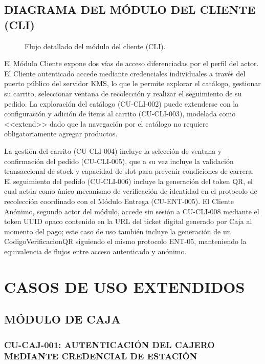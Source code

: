 \subsection{DIAGRAMA DEL MÓDULO DEL CLIENTE (CLI)}
\begin{figure}[H]
    \centering
    
    \caption{Flujo detallado del módulo del cliente (CLI).}
    \label{fig:casos_uso_cliente}
\end{figure}

El Módulo Cliente expone dos vías de acceso diferenciadas por el perfil del actor. El Cliente autenticado accede mediante credenciales individuales a través del puerto público del servidor KMS, lo que le permite explorar el catálogo, gestionar su carrito, seleccionar ventana de recolección y realizar el seguimiento de su pedido. La exploración del catálogo (CU-CLI-002) puede extenderse con la configuración y adición de ítems al carrito (CU-CLI-003), modelada como <<extend>> dado que la navegación por el catálogo no requiere obligatoriamente agregar productos.

La gestión del carrito (CU-CLI-004) incluye la selección de ventana y confirmación del pedido (CU-CLI-005), que a su vez incluye la validación transaccional de stock y capacidad de slot para prevenir condiciones de carrera. El seguimiento del pedido (CU-CLI-006) incluye la generación del token QR, el cual actúa como único mecanismo de verificación de identidad en el protocolo de recolección coordinado con el Módulo Entrega (CU-ENT-005). El Cliente Anónimo, segundo actor del módulo, accede sin sesión a CU-CLI-008 mediante el token UUID opaco contenido en la URL del ticket digital generado por Caja al momento del pago; este caso de uso también incluye la generación de un CodigoVerificacionQR siguiendo el mismo protocolo ENT-05, manteniendo la equivalencia de flujos entre acceso autenticado y anónimo.

\section{CASOS DE USO EXTENDIDOS}
\subsection{MÓDULO DE CAJA}
\subsubsection{CU-CAJ-001: AUTENTICACIÓN DEL CAJERO MEDIANTE CREDENCIAL DE ESTACIÓN}
